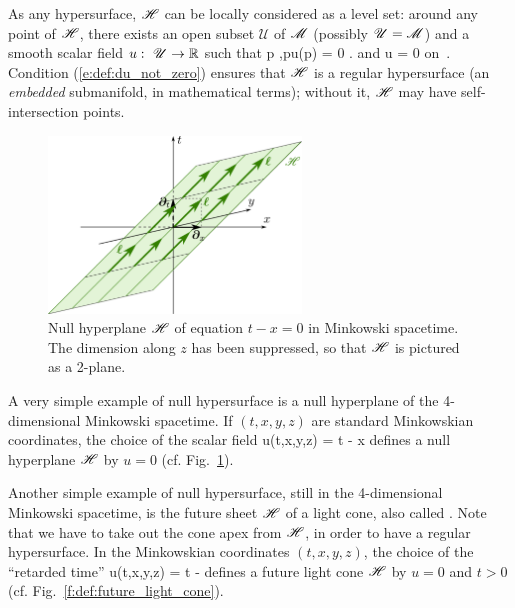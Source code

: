 As any hypersurface, $\mathscr{H}$ can be locally considered as a level set:
around any point of $\mathscr{H}$, there exists an open subset $\mathscr{U}$
of $\mathscr{M}$ (possibly  $\mathscr{U} = \mathscr{M}$) and
a smooth scalar field $u:\ \mathscr{U} \rightarrow \mathbb{R}$ such that
\be \label{e:def:Hor_u_zero}
    \forall p \in {},\quad p\in \Hor \iff u(p) = 0 .
\ee
and
\be \label{e:def:du_not_zero}
    \wnab u \not = 0 \quad \mbox{on}\ \Hor .
\ee
Condition (\ref{e:def:du_not_zero}) ensures that $\mathscr{H}$ is a regular
hypersurface (an \emph{embedded} submanifold, in mathematical terms); without it, $\mathscr{H}$ may have
self-intersection points.

\begin{figure}
\centerline{\includegraphics[width=0.6\textwidth]{def_null_hplane.pdf}}
\caption[]{\label{f:def:null_hplane} \footnotesize
Null hyperplane $\mathscr{H}$ of equation $t-x=0$ in Minkowski spacetime.
The dimension along $z$ has been suppressed, so that $\mathscr{H}$ is pictured as a
2-plane.}
\end{figure}


\begin{example} \label{x:def:null_hyp}
A very simple example of null hypersurface is a null hyperplane of
the 4-dimensional Minkowski spacetime. If $(t,x,y,z)$ are standard Minkowskian
coordinates, the choice of the scalar field
\be \label{e:def:null_plane_u}
    u(t,x,y,z) = t - x
\ee
defines a null hyperplane $\mathscr{H}$ by $u=0$ (cf. Fig.~\ref{f:def:null_hplane}).
\end{example}

\begin{example} \label{x:def:light_cone}
Another simple example of null hypersurface, still in the 4-dimensional Minkowski spacetime,
is the future sheet $\mathscr{H}$ of a light cone, also
called . Note that we have
to take out the cone apex from $\mathscr{H}$, in order to have a regular hypersurface.
In the  Minkowskian coordinates $(t,x,y,z)$, the choice of the
``retarded time''
\be \label{e:def:light_cone_u}
    u(t,x,y,z) = t - 
\ee
defines a future light cone $\mathscr{H}$ by $u=0$ and $t>0$ (cf.
Fig.~\ref{f:def:future_light_cone}).
\end{example}

